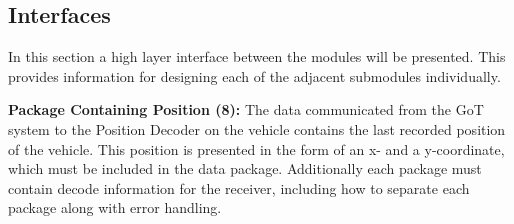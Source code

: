 

\subsection{Interfaces}
In this section a high layer interface between the modules will be presented. This provides information for designing each of the adjacent submodules individually.

\textbf{Package Containing Position (8):}
The data communicated from the GoT system to the Position Decoder on the vehicle contains the last recorded position of the vehicle. This position is presented in the form of an x- and a y-coordinate, which must be included in the data package. Additionally each package must contain decode information for the receiver, including how to separate each package along with error handling.

